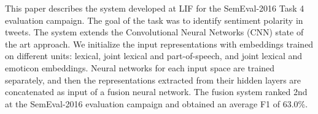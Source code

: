 This paper describes the system developed at LIF for the SemEval-2016 Task 4 evaluation campaign. The goal of the task was to identify sentiment polarity in tweets. The system extends the Convolutional Neural Networks (CNN) state of the art approach. We initialize the input representations with embeddings trained on different units: lexical, joint lexical and part-of-speech, and joint lexical and emoticon embeddings. Neural networks for each input space are trained separately, and then the representations extracted from their hidden layers are concatenated as input of a fusion neural network. The fusion system ranked 2nd at the SemEval-2016 evaluation campaign and obtained an average F1 of 63.0\%.
